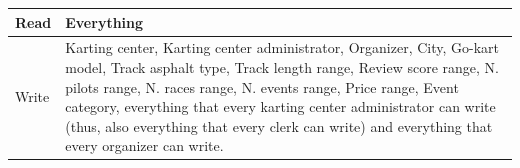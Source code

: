 \documentclass{beamer}
\begin{document}
\begin{frame}
    \begin{table}
        \tiny
        \begin{tabular}{|p{2cm}|p{6cm}|}
        \hline
        Read & Everything \\
        \hline
        Write & Karting center, Karting center administrator, Organizer, City, Go-kart model, Track asphalt type, Track length range, Review score range, N. pilots range,
        N. races range, N. events range, Price range, Event category, everything that every karting center administrator can write (thus, also everything that every clerk can write) and 
        everything that every organizer can write. \\
        \hline
        \end{tabular}
    \end{table}
\end{frame}
\end{document}
